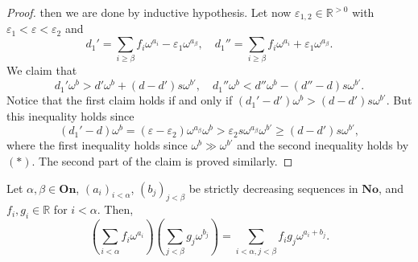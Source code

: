 \begin{proof}
then we are done by inductive hypothesis.  Let now $\varepsilon_{1, 2}\in \mathds{R}^{>0}$ with $\varepsilon_1<\varepsilon<\varepsilon_2$ and
$$d_1'= \sum_{i\geq \beta}f_i\omega^{a_i}-\varepsilon_1\omega^{a_\beta}, \quad d_1''=\sum_{i\geq \beta}f_i\omega^{a_i}+\varepsilon_1\omega^{a_\beta}.$$
We claim that 
$$d_1'\omega^b>d'\omega^b+(d-d')s\omega^{b'}, \quad d_1''\omega^b<d''\omega^b-(d''-d)s\omega^{b'}.$$
Notice that the first claim holds if and only if $(d_1'-d')\omega^b>(d-d')s\omega^{b'}$.  But this inequality holds since
$$(d_1'-d)\omega^b= (\varepsilon-\varepsilon_2)\omega^{a_\beta}\omega^b> \varepsilon_2s\omega^{a_\beta}\omega^{b'} \geq (d-d')s\omega^{b'},$$
where the first inequality holds since $\omega^b\gg \omega^{b'}$ and the second inequality holds by $(*)$.  The second part of the claim is proved similarly.
\end{proof}

\begin{proposition} Let $\alpha, \beta \in \textbf{On}$, $(a_i)_{i<\alpha}$, $(b_j)_{j<\beta}$ be strictly decreasing sequences in $\textbf{No}$, and $f_i, g_i\in \mathds{R}$ for $i<\alpha$. Then,
$$\left (\sum_{i<\alpha}f_i\omega^{a_i} \right ) \left ( \sum_{j<\beta}g_j\omega^{b_j} \right ) = \sum_{i<\alpha, j<\beta} f_ig_j \omega^{a_i+b_j}.$$
\end{proposition}


